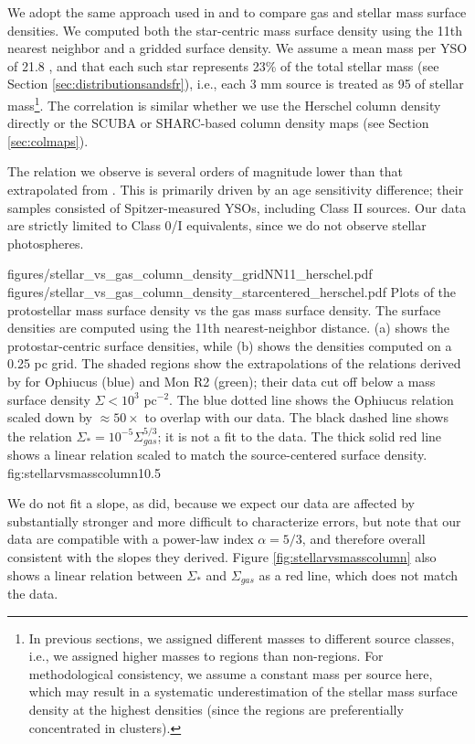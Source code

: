 \documentclass[twocolumn]{aastex61}
\begin{document}
We adopt the same approach used in \citet{Gutermuth2009a} and
\citet{Gutermuth2011a} to compare gas and stellar mass surface densities.  We
computed both the star-centric mass surface density using the 11th nearest
neighbor and a gridded surface density.  We assume a mean mass per YSO of 21.8
\msun, and that each such star represents 23\% of the total stellar mass (see
Section \ref{sec:distributionsandsfr}), i.e., each 3 mm source is treated as 95
\msun of stellar mass\footnote{In previous sections, we assigned different
masses to different source classes, i.e., we assigned higher masses to \hii regions
than non-\hii regions.  For methodological consistency, we assume a constant mass
per source here, which may result in a systematic underestimation of 
the stellar mass surface density at the highest densities (since the \hii regions
are preferentially concentrated in clusters).}. The correlation is similar whether we use the Herschel
column density directly or the SCUBA or SHARC-based column density maps (see
Section \ref{sec:colmaps}).  

The relation we observe is several orders of magnitude lower than that
extrapolated from \citet{Gutermuth2011a}.  This is primarily driven by an age
sensitivity difference; their samples consisted of Spitzer-measured YSOs,
including Class II sources.  Our data are strictly limited to Class 0/I
equivalents, since we do not observe stellar photospheres.

\FigureTwo
{figures/stellar_vs_gas_column_density_gridNN11_herschel.pdf}
{figures/stellar_vs_gas_column_density_starcentered_herschel.pdf}
{Plots of the protostellar mass surface density vs the gas mass surface
density.  The surface densities are computed using the 11th nearest-neighbor
distance.  (a) shows the protostar-centric surface densities, while (b) shows
the densities computed on a 0.25 pc grid.  The shaded regions
show the extrapolations of the relations derived by \citet{Gutermuth2011a}
for Ophiucus (blue) and Mon R2 (green); their data cut off below a mass
surface density $\Sigma < 10^3$ \msun pc$^{-2}$. 
The blue dotted line shows the Ophiucus relation scaled down by
$\approx50\times$ to overlap with our data.
The black dashed line shows the relation $\Sigma_* = 10^{-5}
\Sigma_{gas}^{5/3}$; it is not a fit to the data.
The thick solid red line shows a linear relation scaled
to match the source-centered surface density.}
{fig:stellarvsmasscolumn}{1}{0.5\textwidth}

We do not fit a slope, as \citet{Gutermuth2011a} did, because we expect our
data are affected by substantially stronger and more difficult to characterize
errors, but note that our data are compatible with a power-law index
$\alpha=5/3$, and therefore overall consistent with the slopes they
derived.  Figure \ref{fig:stellarvsmasscolumn} also shows a linear relation
between $\Sigma_*$ and $\Sigma_{gas}$ as a red line, which does not match
the data.
\end{document}
